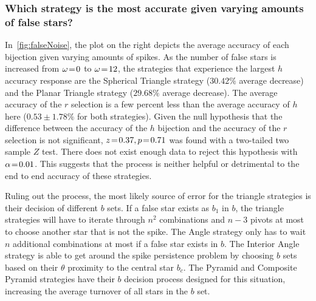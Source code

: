 \subsubsection{Which strategy is the most accurate given varying amounts of false stars?}
%
%
%
%
In~\autoref{fig:falseNoise}, the plot on the right depicts the average accuracy of each bijection given varying amounts
of spikes.
As the number of false stars is increased from $\omega \!=\! 0$ to $\omega \!=\! 12$, the strategies that experience
the largest $h$ accuracy response are the Spherical Triangle strategy ($30.42\%$ average decrease) and the Planar
Triangle strategy ($29.68\%$ average decrease).
The average accuracy of the $r$ selection is a few percent less than the average accuracy of $h$ here
($0.53\!\pm\!1.78\%$ for both strategies).
Given the null hypothesis that the difference between the accuracy of the $h$ bijection and the accuracy of the $r$
selection is not significant, $z \!=\! 0.37, p \!=\! 0.71$ was found with a two-tailed two sample $Z$ test.
There does not exist enough data to reject this hypothesis with $\alpha \!=\! 0.01$.
This suggests that the  process is neither helpful or detrimental to the end to end accuracy of these
strategies.

Ruling out the  process, the most likely source of error for the triangle strategies is their decision of
different $b$ sets.
If a false star exists as $b_1$ in $b$, the triangle strategies will have to iterate through $n^2$ combinations and
$n - 3$ pivots at most to choose another star that is not the spike.
The Angle strategy only has to wait $n$ additional combinations at most if a false star exists in $b$.
The Interior Angle strategy is able to get around the spike persistence problem by choosing $b$ sets based on their
$\theta$ proximity to the central star $b_c$.
The Pyramid and Composite Pyramid strategies have their $b$ decision process designed for this situation, increasing the
average turnover of all stars in the $b$ set.

